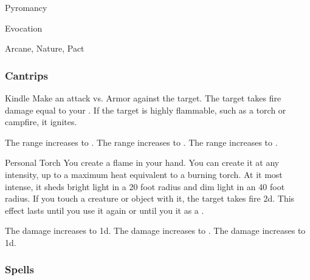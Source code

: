 \newpage
\begin{spellsection}{Pyromancy}

\begin{spellheader}
\end{spellheader}


 Evocation

 Arcane, Nature, Pact

\subsubsection{Cantrips}


\begin{freeability}{Kindle}
Make an attack vs. Armor against the target.
\hit The target takes fire damage equal to your .
If the target is highly flammable, such as a torch or campfire, it ignites.

\rankline
{} The range increases to \rngmed.
 The range increases to \rnglong.
 The range increases to \rngext.
\end{freeability}


\begin{freeability}{Personal Torch}
You create a flame in your hand.
You can create it at any intensity, up to a maximum heat equivalent to a burning torch.
At it most intense, it sheds bright light in a 20 foot radius and dim light in an 40 foot radius.
If you touch a creature or object with it, the target takes fire  \minus2d.
This effect lasts until you use it again or until you  it as a .

\rankline
{} The damage increases to  \minus1d.
 The damage increases to .
 The damage increases to  \plus1d.
\end{freeability}

\end{spellsection}


\subsubsection{Spells}


